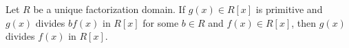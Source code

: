 Let $R$ be a unique factorization domain. If $g(x) \in R[x]$ is primitive and $g(x)$ divides $b f(x)$ in $R[x]$ for some $b \in R$ and $f(x) \in R[x]$, then $g(x)$ divides $f(x)$ in $R[x]$.
